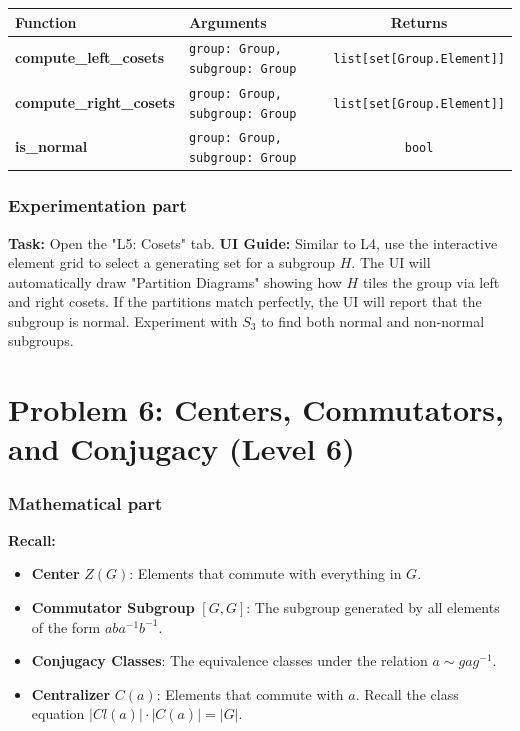 \documentclass[11pt]{article}
\begin{document}
\begin{center}
\renewcommand{\arraystretch}{1.5}
\begin{tabularx}{\textwidth}{@{} >{\bfseries}l X c @{}}
\toprule
Function & Arguments & Returns \\ \midrule
compute\_left\_cosets & \lstinline|group: Group, subgroup: Group| & \lstinline|list[set[Group.Element]]| \\
compute\_right\_cosets & \lstinline|group: Group, subgroup: Group| & \lstinline|list[set[Group.Element]]| \\
is\_normal & \lstinline|group: Group, subgroup: Group| & \lstinline|bool| \\
\bottomrule
\end{tabularx}
\end{center}

\subsubsection*{Experimentation part}
\textbf{Task:} Open the "L5: Cosets" tab.
\textbf{UI Guide:} Similar to L4, use the interactive element grid to select a generating set for a subgroup $H$. The UI will automatically draw "Partition Diagrams" showing how $H$ tiles the group via left and right cosets. If the partitions match perfectly, the UI will report that the subgroup is normal. Experiment with $S_3$ to find both normal and non-normal subgroups.

\vspace{1cm}

\section*{Problem 6: Centers, Commutators, and Conjugacy (Level 6)}

\subsubsection*{Mathematical part}
\textbf{Recall:} 
\begin{itemize}
    \item \textbf{Center} $Z(G)$: Elements that commute with everything in $G$.
    \item \textbf{Commutator Subgroup} $[G, G]$: The subgroup generated by all elements of the form $aba^{-1}b^{-1}$.
    \item \textbf{Conjugacy Classes}: The equivalence classes under the relation $a \sim g a g^{-1}$.
    \item \textbf{Centralizer} $C(a)$: Elements that commute with $a$. Recall the class equation $|Cl(a)| \cdot |C(a)| = |G|$.
\end{itemize}
\end{document}

